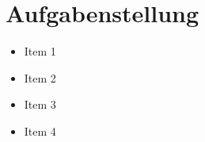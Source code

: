 \section{Aufgabenstellung}
\lipsum[1]

\begin{itemize}
    \itemsep0em
    \item Item 1
    \item Item 2
    \item Item 3
    \item Item 4
\end{itemize}
